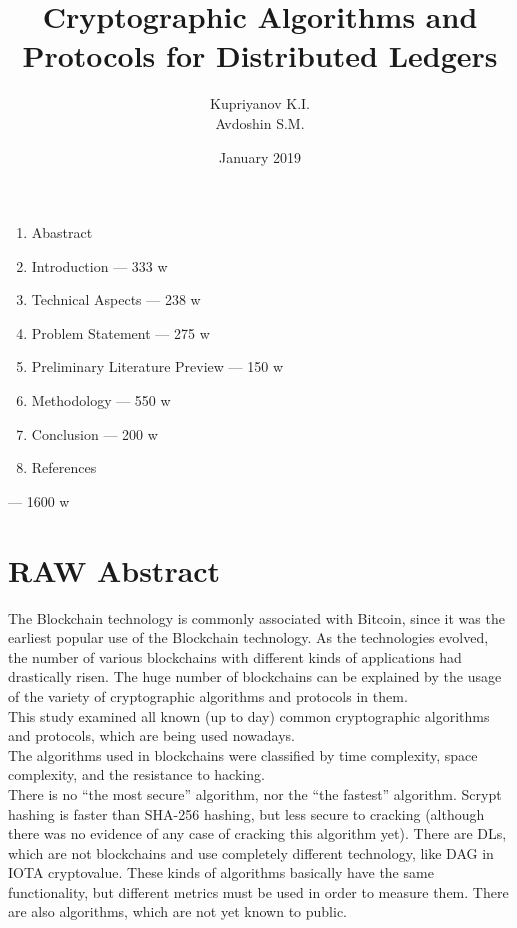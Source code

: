 \documentclass[12pt]{article}
\title{Cryptographic Algorithms and Protocols for Distributed Ledgers}
\author{Kupriyanov K.I.\\Avdoshin S.M.}
\date{January 2019}
\begin{document}
\maketitle
\begin{enumerate}
    \item Abastract
    \item Introduction --- 333 w
    \item Technical Aspects --- 238 w
    \item Problem Statement --- 275 w
    \item Preliminary Literature Preview --- 150 w
    \item Methodology --- 550 w
    \item Conclusion --- 200 w
    \item References
\end{enumerate}
        --- 1600 w

\section*{RAW Abstract}
The Blockchain technology is commonly associated with Bitcoin, since it was the
earliest popular use of the Blockchain technology. As the technologies evolved,
the number of various blockchains with different kinds of applications had
drastically risen. The huge number of blockchains can be explained by the usage
of the variety of cryptographic algorithms and protocols in them.\\
This study examined all known (up to day) common cryptographic algorithms and
protocols, which are being used nowadays.\\
The algorithms used in blockchains were classified by time complexity, space
complexity, and the resistance to hacking.\\
There is no ``the most secure'' algorithm, nor the ``the fastest'' algorithm.
Scrypt hashing is faster than SHA-256 hashing, but less secure to cracking
(although there was no evidence of any case of cracking this algorithm yet).
There are DLs, which are not blockchains and use completely different
technology, like DAG in IOTA cryptovalue. These kinds of algorithms basically
have the same functionality, but different metrics must be used in order to
measure them. There are also algorithms, which are not yet known to public.\\
\end{document}
